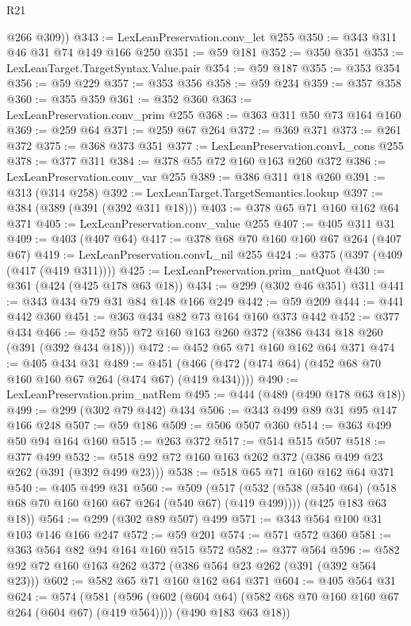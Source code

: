 \begin{lexlean}{R21}
\begin{coremodule}
        @266
        @309))
@343 := LexLeanPreservation.conv_let @255
@350 := @343 @311 @46 @31 @74 @149 @166 @250
@351 := @59 @181
@352 := @350 @351
@353 := LexLeanTarget.TargetSyntax.Value.pair
@354 := @59 @187
@355 := @353 @354
@356 := @59 @229
@357 := @353 @356
@358 := @59 @234
@359 := @357 @358
@360 := @355 @359
@361 := @352 @360
@363 := LexLeanPreservation.conv_prim @255
@368 := @363 @311 @50 @73 @164 @160
@369 := @259 @64
@371 := @259 @67 @264
@372 := @369 @371
@373 := @261 @372
@375 := @368 @373 @351
@377 := LexLeanPreservation.convL_cons @255
@378 := @377 @311
@384 := @378 @55 @72 @160 @163 @260 @372
@386 := LexLeanPreservation.conv_var @255
@389 := @386 @311 @18 @260
@391 := @313 (@314 @258)
@392 := LexLeanTarget.TargetSemantics.lookup
@397 := @384 (@389 (@391 (@392 @311 @18)))
@403 := @378 @65 @71 @160 @162 @64 @371
@405 := LexLeanPreservation.conv_value @255
@407 := @405 @311 @31
@409 := @403 (@407 @64)
@417 := @378 @68 @70 @160 @160 @67 @264 (@407 @67)
@419 := LexLeanPreservation.convL_nil @255
@424 := @375 (@397 (@409 (@417 (@419 @311))))
@425 := LexLeanPreservation.prim_natQuot
@430 := @361 (@424 (@425 @178 @63 @18))
@434 := @299 (@302 @46 @351) @311
@441 := @343 @434 @79 @31 @84 @148 @166 @249
@442 := @59 @209
@444 := @441 @442 @360
@451 := @363 @434 @82 @73 @164 @160 @373 @442
@452 := @377 @434
@466 := @452 @55 @72 @160 @163 @260 @372 (@386 @434 @18 @260 (@391 (@392 @434 @18)))
@472 := @452 @65 @71 @160 @162 @64 @371
@474 := @405 @434 @31
@489 := @451 (@466 (@472 (@474 @64) (@452 @68 @70 @160 @160 @67 @264 (@474 @67) (@419 @434))))
@490 := LexLeanPreservation.prim_natRem
@495 := @444 (@489 (@490 @178 @63 @18))
@499 := @299 (@302 @79 @442) @434
@506 := @343 @499 @89 @31 @95 @147 @166 @248
@507 := @59 @186
@509 := @506 @507 @360
@514 := @363 @499 @50 @94 @164 @160
@515 := @263 @372
@517 := @514 @515 @507
@518 := @377 @499
@532 := @518 @92 @72 @160 @163 @262 @372 (@386 @499 @23 @262 (@391 (@392 @499 @23)))
@538 := @518 @65 @71 @160 @162 @64 @371
@540 := @405 @499 @31
@560 := @509
    (@517
      (@532 (@538 (@540 @64) (@518 @68 @70 @160 @160 @67 @264 (@540 @67) (@419 @499))))
      (@425 @183 @63 @18))
@564 := @299 (@302 @89 @507) @499
@571 := @343 @564 @100 @31 @103 @146 @166 @247
@572 := @59 @201
@574 := @571 @572 @360
@581 := @363 @564 @82 @94 @164 @160 @515 @572
@582 := @377 @564
@596 := @582 @92 @72 @160 @163 @262 @372 (@386 @564 @23 @262 (@391 (@392 @564 @23)))
@602 := @582 @65 @71 @160 @162 @64 @371
@604 := @405 @564 @31
@624 := @574
    (@581
      (@596 (@602 (@604 @64) (@582 @68 @70 @160 @160 @67 @264 (@604 @67) (@419 @564))))
      (@490 @183 @63 @18))

\end{coremodule}
\end{lexlean}
